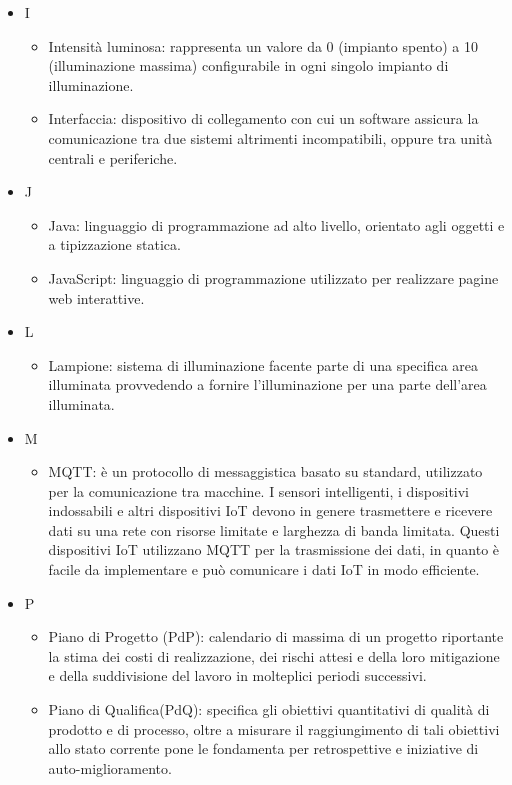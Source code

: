 \documentclass[12pt]{article}
\begin{document}
\begin{itemize}
\begin{itemize}
    \end{itemize}
    \item[] I
    \begin{itemize}
        \item Intensità luminosa: rappresenta un valore da 0 (impianto spento) a 10 (illuminazione massima) configurabile in ogni singolo impianto di illuminazione.
        \item Interfaccia: dispositivo di collegamento con cui un software assicura la comunicazione tra due sistemi altrimenti incompatibili, oppure tra unità centrali e periferiche.    
    \end{itemize}
    \item[] J
    \begin{itemize}
        \item Java: linguaggio di programmazione ad alto livello, orientato agli oggetti e a tipizzazione statica.
        \item JavaScript: linguaggio di programmazione utilizzato per realizzare pagine web interattive.
    \end{itemize}
    \item[] L
    \begin{itemize}
        \item Lampione: sistema di illuminazione facente parte di una specifica area illuminata provvedendo a fornire l’illuminazione per una parte dell’area illuminata.
    \end{itemize}
    \item[] M
    \begin{itemize}
        \item MQTT: è un protocollo di messaggistica basato su standard, utilizzato per la comunicazione tra macchine. I sensori intelligenti, i dispositivi indossabili e altri dispositivi IoT devono in genere trasmettere e ricevere dati su una rete con risorse limitate e larghezza di banda limitata. Questi dispositivi IoT utilizzano MQTT per la trasmissione dei dati, in quanto è facile da implementare e può comunicare i dati IoT in modo efficiente.
    \end{itemize}
    \item[] P
    \begin{itemize}
        \item Piano di Progetto (PdP): calendario di massima di un progetto riportante la stima dei costi di realizzazione, dei rischi attesi e della loro mitigazione e della suddivisione del lavoro in molteplici periodi successivi. 
        \item Piano di Qualifica(PdQ): specifica gli obiettivi quantitativi di qualità di prodotto e di processo, oltre a misurare il raggiungimento di tali obiettivi allo stato corrente pone le fondamenta per retrospettive e iniziative di auto-miglioramento.

\end{itemize}
\end{itemize}
\end{document}

